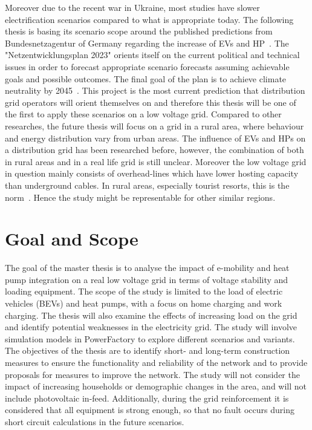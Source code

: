 Moreover due to the recent war in Ukraine, most studies have slower electrification scenarios compared to what is appropriate today. The following thesis is basing its scenario scope around the published predictions from Bundesnetzagentur of Germany regarding the increase of EVs and HP~\cite{netzentwicklungsplan}. The "Netzentwicklungsplan 2023" orients itself on the current political and technical issues in order to forecast appropriate scenario forecasts assuming achievable goals and possible outcomes. The final goal of the plan is to achieve climate neutrality by 2045~\cite{netzentwicklungsplan}. This project is the most current prediction that distribution grid operators will orient themselves on and therefore this thesis will be one of the first to apply these scenarios on a low voltage grid. Compared to other researches, the future thesis will focus on a grid in a rural area, where behaviour and energy distribution vary from urban areas. The influence of EVs and HPs on a distribution grid has been researched before, however, the combination of both in rural areas and in a real life grid is still unclear. Moreover the low voltage grid in question mainly consists of overhead-lines which have lower hosting capacity than underground cables. In rural areas, especially tourist resorts, this is the norm~\cite{ior}. Hence the study might be representable for other similar regions. 


\section{Goal and Scope}
The goal of the master thesis is to analyse the impact of e-mobility and heat pump integration on a real low voltage grid in terms of voltage stability and loading equipment. The scope of the study is limited to the load of electric vehicles (BEVs) and heat pumps, with a focus on home charging and work charging. The thesis will also examine the effects of increasing load on the grid and identify potential weaknesses in the electricity grid. The study will involve simulation models in PowerFactory to explore different scenarios and variants. The objectives of the thesis are to identify short- and long-term construction measures to ensure the functionality and reliability of the network and to provide proposals for measures to improve the network. The study will not consider the impact of increasing households or demographic changes in the area, and will not include photovoltaic in-feed. Additionally, during the grid reinforcement it is considered that all equipment is strong enough, so that no fault occurs during short circuit calculations in the future scenarios.

